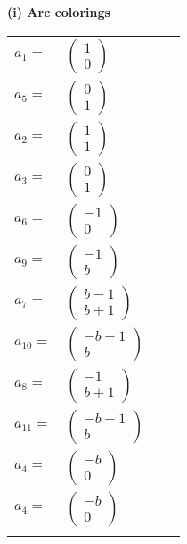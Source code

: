 \documentclass[1p]{elsarticle_modified}
\theoremstyle{definition}
\begin{document}
\flushleft \textbf{(i) Arc colorings}\\
\begin{tabular}{m{7pt} m{180pt} m{7pt} m{180pt} }
\flushright $a_{1}=$&$\begin{pmatrix}1\\0\end{pmatrix}$ \\
\flushright $a_{5}=$&$\begin{pmatrix}0\\1\end{pmatrix}$ \\
\flushright $a_{2}=$&$\begin{pmatrix}1\\1\end{pmatrix}$ \\
\flushright $a_{3}=$&$\begin{pmatrix}0\\1\end{pmatrix}$ \\
\flushright $a_{6}=$&$\begin{pmatrix}-1\\0\end{pmatrix}$ \\
\flushright $a_{9}=$&$\begin{pmatrix}-1\\b\end{pmatrix}$ \\
\flushright $a_{7}=$&$\begin{pmatrix}b-1\\b+1\end{pmatrix}$ \\
\flushright $a_{10}=$&$\begin{pmatrix}- b-1\\b\end{pmatrix}$ \\
\flushright $a_{8}=$&$\begin{pmatrix}-1\\b+1\end{pmatrix}$ \\
\flushright $a_{11}=$&$\begin{pmatrix}- b-1\\b\end{pmatrix}$ \\
\flushright $a_{4}=$&$\begin{pmatrix}- b\\0\end{pmatrix}$\\ \flushright $a_{4}=$&$\begin{pmatrix}- b\\0\end{pmatrix}$\\&\end{tabular}
\end{document}
